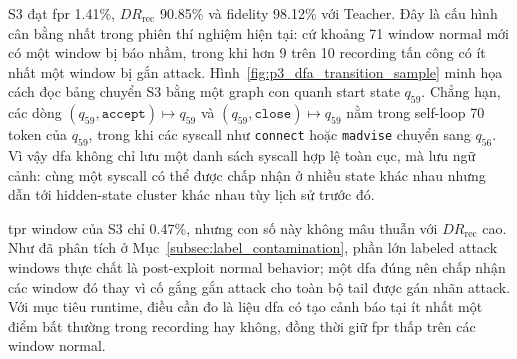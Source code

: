 \documentclass[../main.tex]{subfiles}
\begin{document}
\begin{table}[H]
  \caption{Chú giải các cạnh chính trong graph con DFA ở
  Hình~\ref{fig:p3_dfa_transition_sample}.}
  \label{tab:p3_dfa_edge_sample}
  \centering
\end{table}

S3 đạt \gls{fpr} 1.41\%, $DR_{\text{rec}}$ 90.85\% và fidelity 98.12\% với
Teacher. Đây là
cấu hình cân bằng nhất trong phiên thí nghiệm hiện tại: cứ khoảng 71
window normal mới
có một window bị báo nhầm, trong khi hơn 9 trên 10 recording tấn công
có ít nhất một
window bị gắn attack. Hình~\ref{fig:p3_dfa_transition_sample} minh
họa cách đọc bảng
chuyển S3 bằng một graph con quanh start state $q_{59}$. Chẳng hạn, các dòng
$(q_{59}, \texttt{accept}) \mapsto q_{59}$ và
$(q_{59}, \texttt{close}) \mapsto q_{59}$ nằm trong self-loop 70 token của
$q_{59}$, trong khi các \gls{syscall} như \texttt{connect} hoặc
\texttt{madvise} chuyển
sang $q_{56}$. Vì vậy \gls{dfa} không chỉ lưu một danh sách \gls{syscall} hợp lệ
toàn cục, mà lưu
ngữ cảnh: cùng một \gls{syscall} có thể được chấp nhận ở nhiều state khác
nhau nhưng dẫn tới
hidden-state cluster khác nhau tùy lịch sử trước đó.

\Gls{tpr} window của S3 chỉ 0.47\%, nhưng con số này không mâu thuẫn với
$DR_{\text{rec}}$ cao. Như đã phân tích ở
Mục~\ref{subsec:label_contamination}, phần
lớn labeled attack windows thực chất là post-exploit normal behavior;
một \gls{dfa} đúng nên
chấp nhận các window đó thay vì cố gắng gắn attack cho toàn bộ tail
được gán nhãn attack. Với
mục tiêu runtime, điều cần đo là liệu \gls{dfa} có tạo cảnh báo tại ít nhất
một điểm bất thường
trong recording hay không, đồng thời giữ \gls{fpr} thấp trên các window normal.
\end{document}
